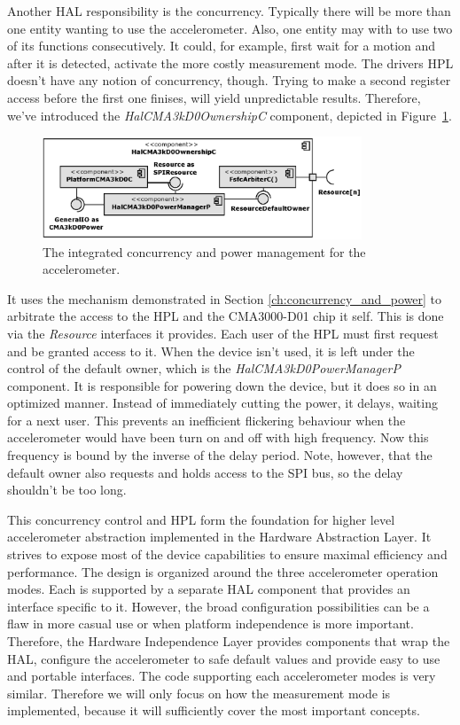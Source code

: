 Another HAL responsibility is the concurrency. Typically there will be more than one entity wanting to use the accelerometer. Also, one entity may with to use two of its functions consecutively. It could, for example, first wait for a motion and after it is detected, activate the more costly measurement mode. The drivers HPL doesn't have any notion of concurrency, though. Trying to make a second register access before the first one finises, will yield unpredictable results. Therefore, we've introduced the \emph{HalCMA3kD0OwnershipC} component, depicted in Figure~\ref{fig:hal_cma3kd0_ownership_c}.
\begin{figure}[h]
  \centering
  \includegraphics[width=0.85\textwidth]{diagrams/hal_cma3kd0_ownership_c.eps}
  \caption{The integrated concurrency and power management for the accelerometer.}
  \label{fig:hal_cma3kd0_ownership_c}
\end{figure}
It uses the mechanism demonstrated in Section \ref{ch:concurrency_and_power} to arbitrate the access to the HPL and the CMA3000-D01 chip it self. This is done via the \emph{Resource} interfaces it provides. Each user of the HPL must first request and be granted access to it. When the device isn't used, it is left under the control of the default owner, which is the \emph{HalCMA3kD0PowerManagerP} component. It is responsible for powering down the device, but it does so in an optimized manner. Instead of immediately cutting the power, it delays, waiting for a next user. This prevents an inefficient flickering behaviour when the accelerometer would have been turn on and off with high frequency. Now this frequency is bound by the inverse of the delay period. Note, however, that the default owner also requests and holds access to the SPI bus, so the delay shouldn't be too long.

This concurrency control and HPL form the foundation for higher level accelerometer abstraction implemented in the Hardware Abstraction Layer. It strives to expose most of the device capabilities to ensure maximal efficiency and performance. The design is organized around the three accelerometer operation modes. Each is supported by a separate HAL component that provides an interface specific to it. However, the broad configuration possibilities can be a flaw in more casual use or when platform independence is more important. Therefore, the Hardware Independence Layer provides components that wrap the HAL, configure the accelerometer to safe default values and provide easy to use and portable interfaces. The code supporting each accelerometer modes is very similar. Therefore we will only focus on how the measurement mode is implemented, because it will sufficiently cover the most important concepts.

